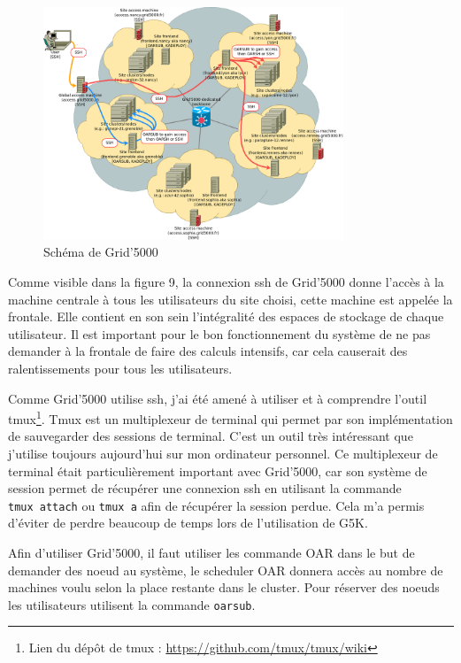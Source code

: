 \documentclass[a4paper,french,12pt, titlepage]{article}
\begin{document}
\begin{figure}[h]
\centering
\includegraphics[width=0.8\textwidth,height=0.8\textheight,keepaspectratio]{images/shemag5k.png}
\caption{Schéma de Grid'5000}
\end{figure}

Comme visible dans la figure 9, la connexion ssh de Grid'5000 donne
l'accès à la machine centrale à tous les utilisateurs du site choisi,
cette machine est appelée la frontale. Elle contient en son sein
l'intégralité des espaces de stockage de chaque utilisateur. Il est
important pour le bon fonctionnement du système de ne pas demander à la
frontale de faire des calculs intensifs, car cela causerait des
ralentissements pour tous les utilisateurs. \newline

Comme Grid'5000 utilise ssh, j'ai été amené à utiliser et à comprendre
l'outil
tmux\footnote{Lien du dépôt de tmux : \url{https://github.com/tmux/tmux/wiki}}.
Tmux est un multiplexeur de terminal qui permet par son implémentation
de sauvegarder des sessions de terminal. C'est un outil très intéressant
que j'utilise toujours aujourd'hui sur mon ordinateur personnel. Ce
multiplexeur de terminal était particulièrement important avec
Grid'5000, car son système de session permet de récupérer une connexion
ssh en utilisant la commande \texttt{tmux\ attach} ou \texttt{tmux\ a}
afin de récupérer la session perdue. Cela m'a permis d'éviter de perdre
beaucoup de temps lors de l'utilisation de G5K.\newline

Afin d'utiliser Grid'5000, il faut utiliser les commande OAR dans le but
de demander des noeud au système, le scheduler OAR donnera accès au
nombre de machines voulu selon la place restante dans le cluster. Pour
réserver des noeuds les utilisateurs utilisent la commande
\texttt{oarsub}.
\end{document}
